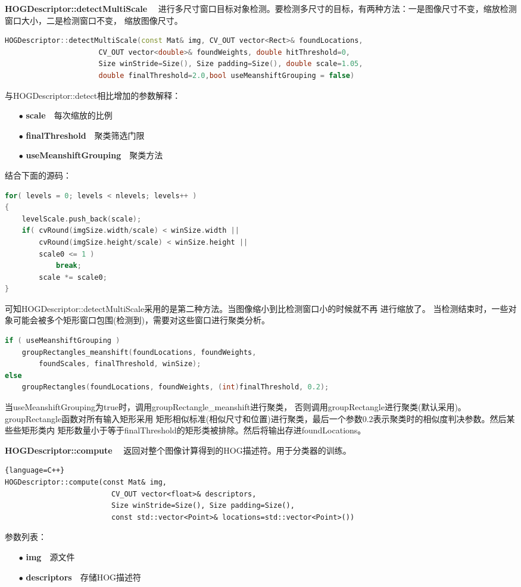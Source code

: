\textbf{HOGDescriptor::detectMultiScale}~~
进行多尺寸窗口目标对象检测。要检测多尺寸的目标，有两种方法：一是图像尺寸不变，缩放检测窗口大小，二是检测窗口不变，
缩放图像尺寸。
\begin{lstlisting}[language=C++]
HOGDescriptor::detectMultiScale(const Mat& img, CV_OUT vector<Rect>& foundLocations,
                      CV_OUT vector<double>& foundWeights, double hitThreshold=0,
                      Size winStride=Size(), Size padding=Size(), double scale=1.05,
                      double finalThreshold=2.0,bool useMeanshiftGrouping = false)
\end{lstlisting}
与\textsf{HOGDescriptor::detect}相比增加的参数解释：
\begin{enumerate}
\item[$\bullet$]\textbf{scale}~~每次缩放的比例
\item[$\bullet$]\textbf{finalThreshold}~~聚类筛选门限
\item[$\bullet$]\textbf{useMeanshiftGrouping}~~聚类方法
\end{enumerate}
结合下面的源码：
\begin{lstlisting}[language=C++]
for( levels = 0; levels < nlevels; levels++ )
{
	levelScale.push_back(scale);
    if( cvRound(imgSize.width/scale) < winSize.width ||
        cvRound(imgSize.height/scale) < winSize.height ||
        scale0 <= 1 )
            break;
        scale *= scale0;
}
\end{lstlisting}
可知\textsf{HOGDescriptor::detectMultiScale}采用的是第二种方法。当图像缩小到比检测窗口小的时候就不再
进行缩放了。
当检测结束时，一些对象可能会被多个矩形窗口包围(检测到)，需要对这些窗口进行聚类分析。
\begin{lstlisting}[language=C++]
if ( useMeanshiftGrouping )
    groupRectangles_meanshift(foundLocations, foundWeights,
        foundScales, finalThreshold, winSize);
else
    groupRectangles(foundLocations, foundWeights, (int)finalThreshold, 0.2);
\end{lstlisting}
当\textsf{useMeanshiftGrouping}为\textsf{true}时，调用\textsf{groupRectangle\_meanshift}进行聚类，
否则调用\textsf{groupRectangle}进行聚类(默认采用)。\textsf{groupRectangle}函数对所有输入矩形采用
矩形相似标准(相似尺寸和位置)进行聚类，最后一个参数0.2表示聚类时的相似度判决参数。然后某些些矩形类内
矩形数量小于等于\textsf{finalThreshold}的矩形类被排除。然后将输出存进\textsf{foundLocations}。

\textbf{HOGDescriptor::compute}~~
返回对整个图像计算得到的HOG描述符。用于分类器的训练。
\begin{lstlisting}{language=C++}
HOGDescriptor::compute(const Mat& img,
                         CV_OUT vector<float>& descriptors,
                         Size winStride=Size(), Size padding=Size(),
                         const std::vector<Point>& locations=std::vector<Point>())
\end{lstlisting}
参数列表：
\begin{enumerate}
\item[$\bullet$]\textbf{img}~~源文件
\item[$\bullet$]\textbf{descriptors}~~存储HOG描述符
\end{enumerate}

